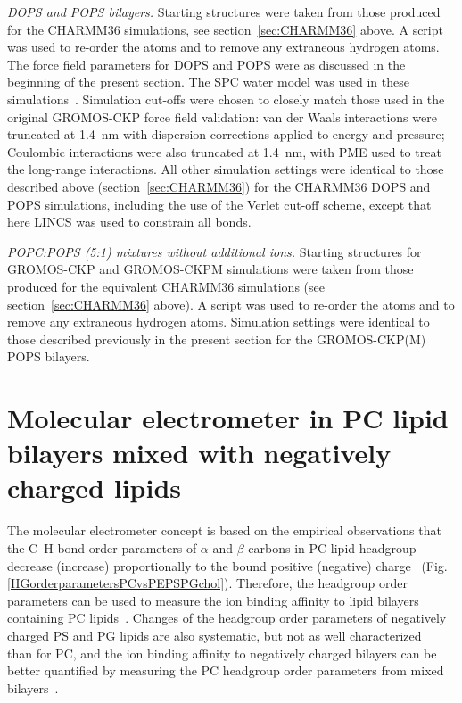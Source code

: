 \documentclass[journal=jpcbfk,manuscript=article]{achemso}
\newcommand{\todo}[1]{\textcolor{red}{#1}}
\begin{document}
\noindent
{\it DOPS and POPS bilayers.} 
Starting structures %
were taken from those produced for the CHARMM36 simulations, see section~\ref{sec:CHARMM36} above.
A script was used to re-order the atoms and to remove any extraneous hydrogen atoms. The force field parameters for DOPS and POPS
were as discussed in the beginning of the present section. The SPC water model was used in these simulations~\cite{berendsen81}. Simulation cut-offs were chosen
to closely match those used in the original GROMOS-CKP force field validation: van der Waals interactions were truncated at 1.4~nm
with dispersion corrections applied to energy and pressure; Coulombic interactions were also truncated at 1.4~nm, with PME used
to treat the long-range interactions. All other simulation settings were identical to those described above (section~\ref{sec:CHARMM36}) for the CHARMM36 DOPS
and POPS simulations, including the use of the Verlet cut-off scheme, except that here LINCS was used to constrain all bonds.


\noindent
{\it POPC:POPS (5:1) mixtures without additional ions.}
Starting structures for GROMOS-CKP and GROMOS-CKPM simulations were taken from those produced for the equivalent CHARMM36 simulations (see section~\ref{sec:CHARMM36} above).
A script was used to re-order the atoms and to remove any extraneous hydrogen atoms. Simulation settings were identical to those described
previously in the present section for the GROMOS-CKP(M) POPS bilayers.



\section{Molecular electrometer in PC lipid bilayers mixed with negatively charged lipids}\label{electrometerFORmixtures}

The molecular electrometer concept is based on the empirical observations that
the C--H bond order parameters of $\alpha$ and $\beta$ carbons in PC lipid headgroup
decrease (increase) proportionally to the bound positive (negative) 
charge~\cite{akutsu81,altenbach84,seelig87,scherer89} (Fig. \ref{HGorderparametersPCvsPEPSPGchol}). 
Therefore, the headgroup order parameters can be used to measure the
ion binding affinity to lipid bilayers containing PC
lipids~\cite{akutsu81,altenbach84,borle85,seelig87,macdonald87,roux90}.
Changes of the headgroup order parameters of negatively charged PS and PG lipids
are also systematic, but not as well characterized~\cite{borle85,macdonald87,roux86,roux90} than for PC, and
the ion binding affinity to negatively charged bilayers
can be better quantified by measuring the PC headgroup order parameters from 
mixed bilayers~\cite{borle85,roux86,macdonald87,roux90,roux91}.
\end{document}

